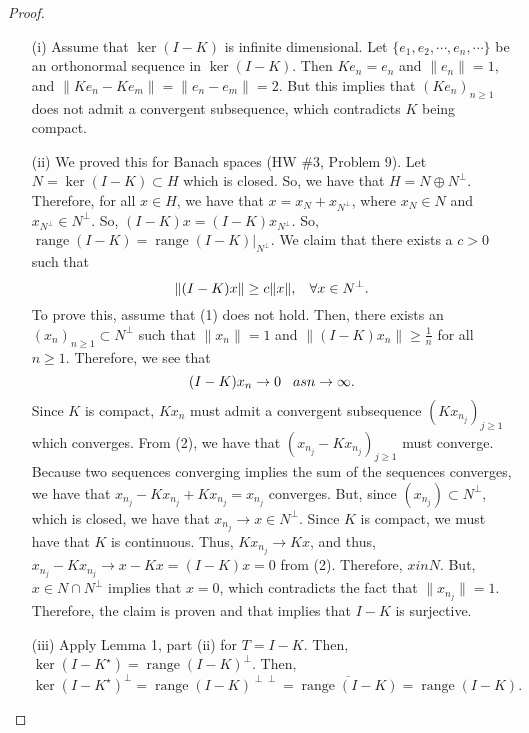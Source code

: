 \documentclass[12pt]{article}
\DeclareMathOperator{\range}{range}
\newcommand{\ov}{\overline}
\newcommand{\sbs}{\subset}
\newcommand{\Ks}{K^{\star}}
\begin{document}
\begin{proof}
\begin{enumerate}
\item[(i)] Assume that $\ker(I - K)$ is infinite dimensional. Let $\{ e_1, e_2, \cdots, e_n, \cdots \}$ be an orthonormal sequence in $\ker(I - K)$. Then $K e_n = e_n$ and $\| e_n \| = 1$, and $\| Ke_n - K e_m \| = \| e_n - e_m \| = 2$. But this implies that $(Ke_n)_{n \geq 1}$ does not admit a convergent subsequence, which contradicts $K$ being compact. 
\item[(ii)] We proved this for Banach spaces (HW \#3, Problem 9). Let $N = \ker(I - K) \sbs H$ which is closed. So, we have that $H = N \oplus N^{\perp}$. Therefore, for all $x \in H$, we have that $x = x_N + x_{N^{\perp}}$, where $x_N \in N$ and $x_{N^{\perp}} \in N^{\perp}$. So, $(I - K)x = (I - K) x_{N^{\perp}}$. So, $\range(I - K) = \range(I - K) \vert_{N^{\perp}}$. We claim that there exists a $c > 0$ such that 
\begin{equation}
\| (I - K) x \| \geq c \| x \|, \hspace{3mm} \forall x\in N^{\perp}.
\end{equation} 
To prove this, assume that (1) does not hold. Then, there exists an $(x_n)_{n \geq 1} \sbs N^{\perp}$ such that $\| x_n \| = 1$ and $\| (I - K) x_n \| \geq \frac{1}{n}$ for all $n \geq 1$. Therefore, we see that 
\begin{equation}
(I - K) x_n \to 0 \hspace{3mm} as n \to \infty.
\end{equation} 
Since $K$ is compact, $Kx_n$ must admit a convergent subsequence $(Kx_{n_j})_{ j \geq 1}$ which converges. From (2), we have that $(x_{n_j} - K x_{n_j})_{j \geq 1}$ must converge. Because two sequences converging implies the sum of the sequences converges, we have that $x_{n_j} - Kx_{n_j} +K x_{n_j} = x_{n_j}$ converges. But, since $(x_{n_j}) \sbs N^{\perp}$, which is closed, we have that $x_{n_j} \to x \in N^{\perp}$. Since $K$ is compact, we must have that $K$ is continuous. Thus, $Kx_{n_j} \to Kx$, and thus, $x_{n_j} - Kx_{n_j} \to x - Kx = (I- K) x = 0$ from (2). Therefore, $x in N$. But, $x \in N \cap N^{\perp}$ implies that $x = 0$, which contradicts the fact that $\| x_{n_j} \| = 1$. Therefore, the claim is proven and that implies that $I - K$ is surjective. 
\item[(iii)] Apply Lemma 1, part (ii) for $T = I - K$. Then, $\ker(I - \Ks) = \range(I - K)^{\perp}$. Then, 
\[ \ker(I - \Ks)^{\perp} = \range(I - K)^{\perp \perp} = \ov{\range(I - K)} = \range(I - K). \]

\end{enumerate}
\end{proof}
\end{document}
